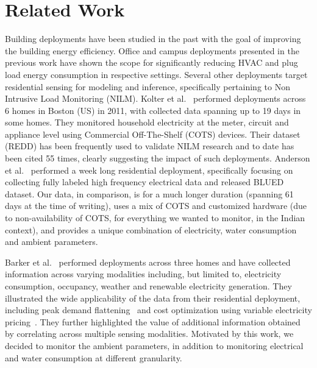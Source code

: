 \documentclass[10pt]{sensys-proc}
\begin{document}
\vspace{-1mm}
\section{Related Work}
 Building deployments have been studied in the past with the goal of improving the building energy efficiency. Office and campus deployments presented in the previous work \cite{yuvraj_ipsn,batra} have shown the scope for significantly reducing HVAC and plug load energy consumption in respective settings. %
Several other deployments target residential sensing for modeling and inference, specifically pertaining to Non Intrusive Load Monitoring (NILM). Kolter et al.~\cite{redd} performed deployments across 6 homes in Boston (US) in 2011, with collected data spanning up to 19 days in some homes. They monitored household electricity at the meter, circuit and appliance level using Commercial Off-The-Shelf (COTS) devices. Their dataset (REDD) has been frequently used to validate NILM research and to date has been cited 55 times, clearly suggesting the impact of such deployments. Anderson et al.~\cite{blued_cmu} performed a week long residential deployment, specifically focusing on collecting fully labeled high frequency electrical data and released BLUED dataset. Our data, in comparison, is for a much longer duration (spanning 61 days at the time of writing), uses a mix of COTS and customized hardware (due to non-availability of COTS, for everything we wanted to monitor, in the Indian context), and provides a unique combination of electricity, water consumption and ambient parameters.

 Barker et al.~\cite{smart} performed deployments across three homes and have collected information across varying modalities including, but limited to, electricity consumption, occupancy, weather and renewable electricity generation. They illustrated the wide applicability of the data from their residential deployment, including peak demand flattening~\cite{smartcap} and cost optimization using variable electricity pricing~\cite{smartcharge}. They further highlighted the value of additional information obtained by correlating across multiple sensing modalities. Motivated by this work, we decided to monitor the ambient parameters, in addition to monitoring electrical and water consumption at different granularity. %
\end{document}
